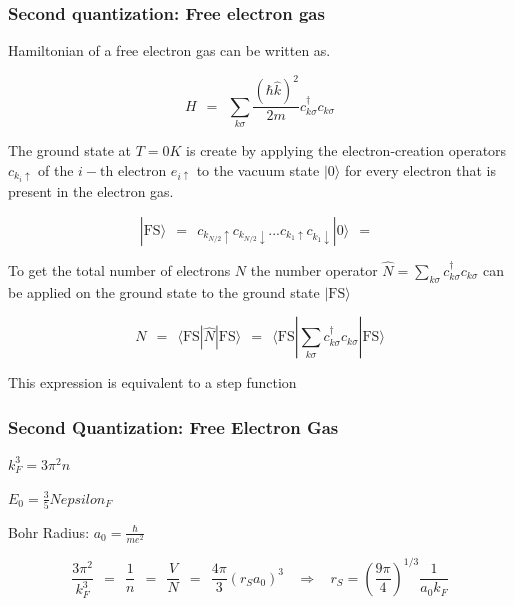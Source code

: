 \documentclass[10pt]{report}
\numberwithin{equation}{chapter}
\begin{document}
\subsubsection{Second quantization: Free electron gas} %

Hamiltonian of a free electron gas can be written as. 

\begin{equation}
  H ~~=~~ \sum_{k \sigma} \frac{(\hbar \hat{k})^2}{2m} c_{k \sigma}^\dag c_{k \sigma}
\end{equation}


The ground state at $T=0K$ is create by applying the electron-creation operators $c_{k_i \uparrow}$ of the $i-\text{th}$ electron $e_{i \uparrow}$ to the vacuum state $|0\rangle$ for every electron that is present in the electron gas. 

\begin{equation}
  | \text{FS} \rangle ~~=~~ c_{k_{N/2} \uparrow} c_{k_{N/2} \downarrow} ... c_{k_1 \uparrow} c_{k_1 \downarrow} | 0 \rangle ~~=~~   
\end{equation}

To get the total number of electrons $N$ the number operator $\hat{N} = \sum_{k \sigma} c_{k\sigma}^\dag c_{k\sigma}$ can be applied on the ground state to the ground state $| \text{FS} \rangle$

\begin{equation}
  N ~~=~~ \langle \text{FS} | \hat{N} | \text{FS} \rangle 
    ~~=~~ \langle \text{FS} | \sum_{k\sigma} c_{k\sigma}^\dag c_{k\sigma} | \text{FS} \rangle
\end{equation} 

This expression is equivalent to a step function 



\subsubsection*{Second Quantization: Free Electron Gas} %

$ k_F^3 = 3 \pi^2 n$

$ E_0 = \frac{3}{5} N epsilon_F$

Bohr Radius: $a_0 = \frac{\hbar}{m e^2}$

\begin{equation*}
\frac{3 \pi^2}{k_F^3} ~~ = ~~ \frac{1}{n} ~~ = ~~ \frac{V}{N} ~~ = ~~ \frac{4\pi}{3} \left(r_S a_0 \right)^3 ~~~~ \Rightarrow ~~~~ r_S = \left( \frac{9\pi}{4} \right)^{1/3} \frac{1}{a_0 k_F}
\end{equation*}
\end{document}
